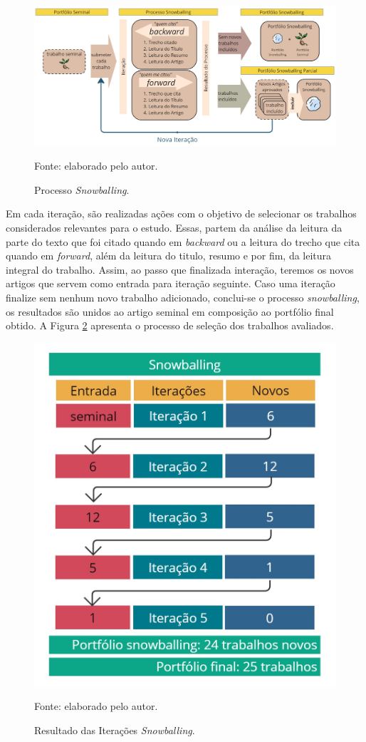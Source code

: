 \begin{figure}[H]
	\centering	
	\caption{Processo \textit{Snowballing}.} 
	\label{fig:cap3snowballing}
	\noindent\includegraphics[width=1\linewidth]{Imagens/cap3/snowballing.jpg} 
	
	Fonte: elaborado pelo autor.
\end{figure}

Em cada iteração, são realizadas ações com o objetivo de selecionar os trabalhos considerados relevantes para o estudo. Essas, partem da análise da leitura da parte do texto que foi citado quando em \textit{backward} ou a leitura do trecho que cita quando em \textit{forward}, além da leitura do titulo, resumo e por fim, da leitura integral do trabalho. Assim, ao passo que finalizada interação, teremos os novos artigos que servem como entrada para iteração seguinte. Caso uma iteração finalize sem nenhum novo trabalho adicionado, conclui-se o processo \textit{snowballing}, os resultados são unidos ao artigo seminal em composição ao portfólio final obtido. A Figura \ref{fig:cap3etapassnowballing} apresenta o processo de seleção dos trabalhos avaliados.

\begin{figure}[H]
	\centering	
	\caption{Resultado das Iterações \textit{Snowballing}.} 
	\label{fig:cap3etapassnowballing}
	\noindent\includegraphics[width=0.7\linewidth]{Imagens/cap3/etapas.jpg} 
	
	Fonte: elaborado pelo autor.
\end{figure}


